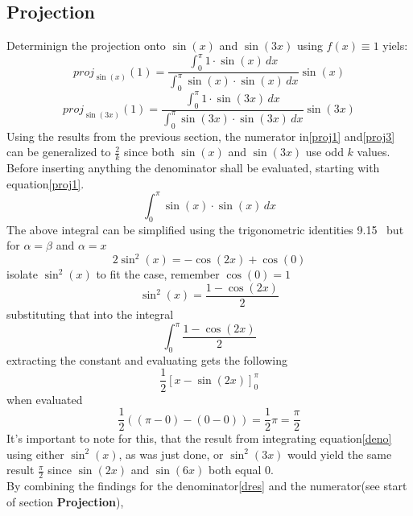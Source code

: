 \documentclass[12pt]{article}
\begin{document}
\subsection*{Projection}
Determinign the projection onto $\sin(x)$ and $\sin(3x)$ using $f(x)\equiv 1$ yiels:
\begin{equation} \label{proj1}
    proj_{\sin(x)}(1) = \frac{\int_{0}^{\pi} 1 \cdot \sin(x) \, dx}{\int_{0}^{\pi}\sin(x)\cdot\sin(x)\,dx} \sin(x)   
\end{equation}
\begin{equation} \label{proj3}
    proj_{\sin(3x)}(1) = \frac{\int_{0}^{\pi} 1 \cdot \sin(3x) \, dx}{\int_{0}^{\pi}\sin(3x)\cdot\sin(3x)\,dx} \sin(3x)
\end{equation}
Using the results from the previous section, the numerator in\eqref{proj1} and\eqref{proj3} can be generalized to $\frac{2}{k}$ since both $\sin(x)$ and $\sin(3x)$ use odd $k$ values.\\
Before inserting anything the denominator shall be evaluated, starting with equation\eqref{proj1}.
\begin{equation*}
    \int_{0}^{\pi}\sin(x)\cdot\sin(x)\,dx
\end{equation*}
The above integral can be simplified using the trigonometric identities 9.15~\cite{NUMLA} but for $\alpha = \beta$ and $\alpha = x$
\[
2\sin^2(x) = -\cos(2x) + \cos(0) 
\]
isolate $\sin^2(x)$ to fit the case, remember $\cos(0) = 1$
\begin{equation} \label{deno}
    \sin^2(x) = \frac{1-\cos(2x)}{2}
\end{equation}
substituting that into the integral
\begin{equation*}
    \int_{0}^{\pi} \frac{1-\cos(2x)}{2}
\end{equation*}
extracting the constant and evaluating gets the following
\begin{equation*}
    \frac{1}{2}[x-\sin(2x)]_{0}^{\pi}
\end{equation*}
when evaluated
\begin{equation} \label{dres}
    \frac{1}{2}((\pi-0)-(0-0)) = \frac{1}{2}\pi = \frac{\pi}{2}
\end{equation}
It's important to note for this, that the result from integrating equation\eqref{deno} using either $\sin^2(x)$, as was just done, or $\sin^2(3x)$ would yield the same result $\frac{\pi}{2}$ since $\sin(2x)$ and $\sin(6x)$ both equal $0$.\\
By combining the findings for the denominator\eqref{dres} and the numerator(see start of section \textbf{Projection}), 
\end{document}
